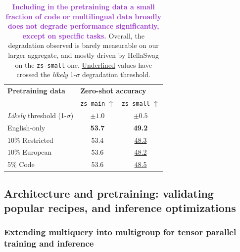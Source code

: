 \documentclass{article}
\DeclareRobustCommand{\data}[1]{\textcolor{DarkOrchid}{#1}}
\begin{document}
\begin{table}[t]
\centering
\vspace{-0.3in}
\caption{\textbf{\data{Including in the pretraining data a small fraction of code or multilingual data broadly does not degrade performance significantly, except on specific tasks.}} Overall, the degradation observed is barely measurable on our larger aggregate, and mostly driven by HellaSwag on the \texttt{zs-small} one. \underline{Underlined} values have crossed the \emph{likely} 1-$\sigma$ degradation threshold.}
\vspace{0.1in}
\label{tab:ml-code-ablations}
\begin{tabular}{lcc}
\toprule
\textbf{Pretraining data} & \multicolumn{2}{l}{\textbf{Zero-shot accuracy}} \\ 
& \texttt{zs-main} $\uparrow$ & \texttt{zs-small} $\uparrow$\\
\emph{Likely} threshold (1-$\sigma$) & $\pm 1.0$ & $\pm 0.5$\\
\midrule
English-only & \textbf{53.7} & \textbf{49.2} \\
10\% Restricted  & 53.4 & \underline{48.3} \\
10\% European  & 53.6 & \underline{48.2} \\
\midrule
5\% Code & 53.6 & \underline{48.5} \\ 
\bottomrule
\end{tabular}
\end{table}

\subsection{Architecture and pretraining: validating popular recipes, and inference optimizations}
\label{sec:arch_ablations}


\subsubsection{Extending multiquery into multigroup for tensor parallel training and inference}
\label{sec:multiquery_abl}
\end{document}
